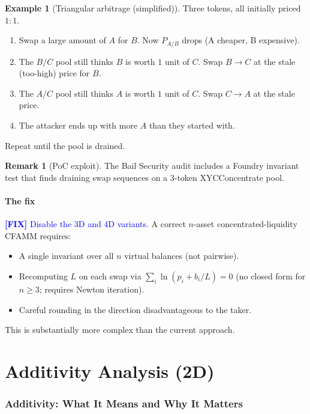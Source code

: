 \documentclass[11pt]{article}
\theoremstyle{definition}
\newtheorem{remark}{Remark}
\newtheorem{example}{Example}
\newcommand{\fix}[1]{\textcolor{blue}{\textbf{[FIX]} #1}}
\begin{document}
\begin{example}[Triangular arbitrage (simplified)]\label{ex:tri-arb}
Three tokens, all initially priced $1{:}1$.
\begin{enumerate}
\item Swap a large amount of $A$ for $B$.  Now $P_{A/B}$ drops (A cheaper, B expensive).
\item The $B/C$ pool still thinks $B$ is worth $1$ unit of $C$.
  Swap $B \to C$ at the stale (too-high) price for $B$.
\item The $A/C$ pool still thinks $A$ is worth $1$ unit of $C$.
  Swap $C \to A$ at the stale price.
\item The attacker ends up with more $A$ than they started with.
\end{enumerate}
Repeat until the pool is drained.
\end{example}

\begin{remark}[PoC exploit]
The Bail Security audit includes a Foundry invariant test that finds
draining swap sequences on a 3-token XYCConcentrate pool.
\end{remark}

\subsection{The fix}

\fix{Disable the 3D and 4D variants.}
A correct $n$-asset concentrated-liquidity CFAMM requires:
\begin{itemize}
\item A single invariant over all $n$ virtual balances (not pairwise).
\item Recomputing $L$ on each swap via $\sum_{i} \ln(p_i + b_i/L) = 0$
  (no closed form for $n \ge 3$; requires Newton iteration).
\item Careful rounding in the direction disadvantageous to the taker.
\end{itemize}
This is substantially more complex than the current approach.


\part{Additivity Analysis (2D)}

\section{Additivity: What It Means and Why It Matters}\label{sec:additivity-intro}
\end{document}
